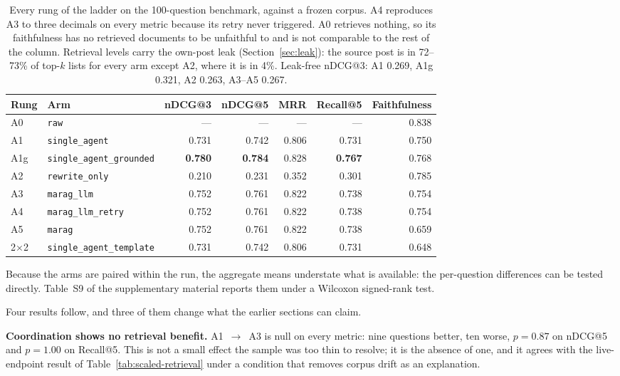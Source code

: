 \documentclass[acmsmall,review,anonymous,screen]{acmart}
\begin{document}
\begin{table}[t]
\caption{Every rung of the ladder on the 100-question benchmark, against a
frozen corpus. A4 reproduces A3 to three decimals on every metric because its
retry never triggered. A0 retrieves nothing, so its faithfulness has no
retrieved documents to be unfaithful to and is not comparable to the rest of
the column. Retrieval levels carry the own-post leak (Section~\ref{sec:leak}):
the source post is in 72--73\% of top-$k$ lists for every arm except A2, where
it is in 4\%. Leak-free nDCG@3: A1 0.269, A1g 0.321, A2 0.263, A3--A5 0.267.}
\label{tab:ladder-results}
\begin{tabular}{llrrrrr}
\toprule
Rung & Arm & nDCG@3 & nDCG@5 & MRR & Recall@5 & Faithfulness \\
\midrule
A0  & \texttt{raw}                   & ---   & ---   & ---   & ---   & 0.838 \\
A1  & \texttt{single\_agent}         & 0.731 & 0.742 & 0.806 & 0.731 & 0.750 \\
A1g & \texttt{single\_agent\_grounded} & \textbf{0.780} & \textbf{0.784} & 0.828 & \textbf{0.767} & 0.768 \\
A2  & \texttt{rewrite\_only}         & 0.210 & 0.231 & 0.352 & 0.301 & 0.785 \\
A3  & \texttt{marag\_llm}            & 0.752 & 0.761 & 0.822 & 0.738 & 0.754 \\
A4  & \texttt{marag\_llm\_retry}     & 0.752 & 0.761 & 0.822 & 0.738 & 0.754 \\
A5  & \texttt{marag}                 & 0.752 & 0.761 & 0.822 & 0.738 & 0.659 \\
2$\times$2 & \texttt{single\_agent\_template} & 0.731 & 0.742 & 0.806 & 0.731 & 0.648 \\
\bottomrule
\end{tabular}
\end{table}

Because the arms are paired within the run, the aggregate means understate what
is available: the per-question differences can be tested directly.
Table~S9 of the supplementary material reports them under a Wilcoxon signed-rank test.

Four results follow, and three of them change what the earlier sections can
claim.

\textbf{Coordination shows no retrieval benefit.} A1~$\to$~A3 is null on every
metric: nine questions better, ten worse, $p=0.87$ on nDCG@5 and $p=1.00$ on
Recall@5. This is not a small effect the sample was too thin to resolve; it is
the absence of one, and it agrees with the live-endpoint result of
Table~\ref{tab:scaled-retrieval} under a condition that removes corpus drift as
an explanation.
\end{document}
